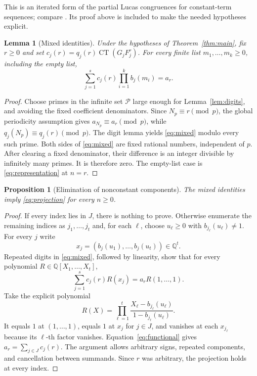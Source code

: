 \documentclass[11pt,a4paper]{article}
\newtheorem{lemma}[theorem]{Lemma}
\newtheorem{proposition}[theorem]{Proposition}
\theoremstyle{remark}\newtheorem{remark}[theorem]{Remark}
\newcommand{\Q}{\mathbb Q}\newcommand{\Z}{\mathbb Z}
\newcommand{\CT}{\operatorname{CT}}
\begin{document}
This is an iterated form of the partial Lucas congruences for constant-term
sequences; compare \cite[Lemma 3.1]{BSY}. Its proof above is included to make
the needed hypotheses explicit.

\begin{lemma}[Mixed identities]\label{lem:mixed}
Under the hypotheses of Theorem~\ref{thm:main}, fix $r\ge0$ and set
$c_j(r)=q_j(r)\CT(G_jF_j^r)$. For every finite list
$m_1,\ldots,m_k\ge0$, including the empty list,
\begin{equation}\label{eq:mixed}
 \sum_{j=1}^s c_j(r)\prod_{i=1}^k b_j(m_i)=a_r.
\end{equation}
\end{lemma}

\begin{proof}
Choose primes in the infinite set $\mathcal P$ large enough for
Lemma~\ref{lem:digits}, and avoiding the fixed coefficient denominators.
Since $N_p\equiv r\pmod p$, the global periodicity assumption gives
$a_{N_p}\equiv a_r\pmod p$, while $q_j(N_p)\equiv q_j(r)\pmod p$.
The digit lemma yields \eqref{eq:mixed} modulo every such prime.
Both sides of \eqref{eq:mixed} are fixed rational numbers, independent of $p$.
After clearing a fixed denominator, their difference is an integer divisible
by infinitely many primes. It is therefore zero. The empty-list case is
\eqref{eq:representation} at $n=r$.
\end{proof}

\begin{proposition}[Elimination of nonconstant components]\label{prop:elim}
The mixed identities imply \eqref{eq:projection} for every $n\ge0$.
\end{proposition}

\begin{proof}
If every index lies in $J$, there is nothing to prove. Otherwise enumerate
the remaining indices as $j_1,\ldots,j_t$ and, for each $\ell$, choose
$u_\ell\ge0$ with $b_{j_\ell}(u_\ell)\ne1$. For every $j$ write
\[
 x_j=(b_j(u_1),\ldots,b_j(u_t))\in\Q^t.
\]
Repeated digits in \eqref{eq:mixed}, followed by linearity, show that for
every polynomial $R\in\Q[X_1,\ldots,X_t]$,
\begin{equation}\label{eq:functional}
 \sum_{j=1}^s c_j(r)R(x_j)=a_r R(1,\ldots,1).
\end{equation}
Take the explicit polynomial
\[
 R(X)=\prod_{\ell=1}^t
 \frac{X_\ell-b_{j_\ell}(u_\ell)}{1-b_{j_\ell}(u_\ell)}.
\]
It equals $1$ at $(1,\ldots,1)$, equals $1$ at $x_j$ for $j\in J$, and
vanishes at each $x_{j_\ell}$ because its $\ell$-th factor vanishes.
Equation~\eqref{eq:functional} gives $a_r=\sum_{j\in J}c_j(r)$.
The argument allows arbitrary signs, repeated components, and cancellation
between summands. Since $r$ was arbitrary, the projection holds at every index.
\end{proof}
\end{document}
